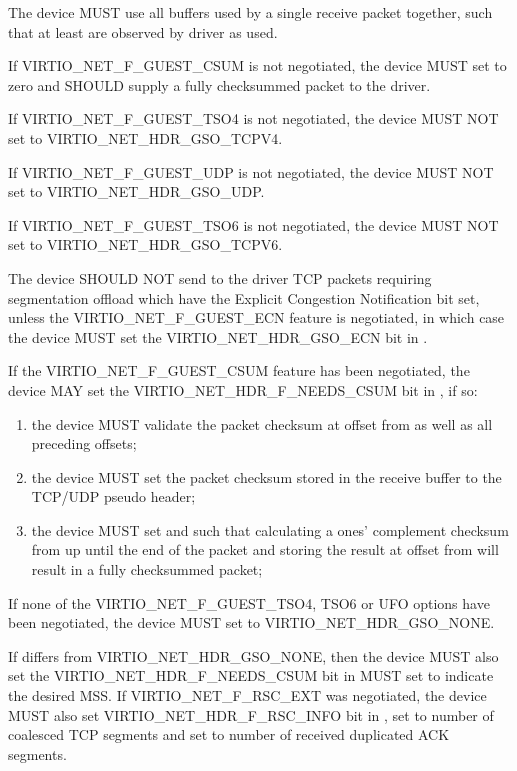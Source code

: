 The device MUST use all buffers used by a single receive
packet together, such that at least  are
observed by driver as used.

If VIRTIO_NET_F_GUEST_CSUM is not negotiated, the device MUST set
 to zero and SHOULD supply a fully checksummed
packet to the driver.

If VIRTIO_NET_F_GUEST_TSO4 is not negotiated, the device MUST NOT set
 to VIRTIO_NET_HDR_GSO_TCPV4.

If VIRTIO_NET_F_GUEST_UDP is not negotiated, the device MUST NOT set
 to VIRTIO_NET_HDR_GSO_UDP.

If VIRTIO_NET_F_GUEST_TSO6 is not negotiated, the device MUST NOT set
 to VIRTIO_NET_HDR_GSO_TCPV6.

The device SHOULD NOT send to the driver TCP packets requiring segmentation offload
which have the Explicit Congestion Notification bit set, unless the
VIRTIO_NET_F_GUEST_ECN feature is negotiated, in which case the
device MUST set the VIRTIO_NET_HDR_GSO_ECN bit in
.

If the VIRTIO_NET_F_GUEST_CSUM feature has been negotiated, the
device MAY set the VIRTIO_NET_HDR_F_NEEDS_CSUM bit in
, if so:
\begin{enumerate}
\item the device MUST validate the packet checksum at
	offset  from  as well as all
	preceding offsets;
\item the device MUST set the packet checksum stored in the
	receive buffer to the TCP/UDP pseudo header;
\item the device MUST set  and
	 such that calculating a ones'
	complement checksum from  up until the
	end of the packet and storing the result at offset
	 from   will result in a
	fully checksummed packet;
\end{enumerate}

If none of the VIRTIO_NET_F_GUEST_TSO4, TSO6 or UFO options have
been negotiated, the device MUST set  to
VIRTIO_NET_HDR_GSO_NONE.

If  differs from VIRTIO_NET_HDR_GSO_NONE, then
the device MUST also set the VIRTIO_NET_HDR_F_NEEDS_CSUM bit in
 MUST set  to indicate the desired MSS.
If VIRTIO_NET_F_RSC_EXT was negotiated, the device MUST also
set VIRTIO_NET_HDR_F_RSC_INFO bit in ,
set  to number of coalesced TCP segments and
set  to number of received duplicated ACK segments.

